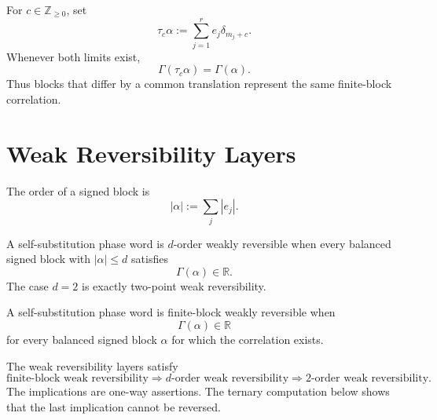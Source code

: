 \begin{definition}
\label{def:innovation-input-block-translation}
For $c\in\mathbb Z_{\ge0}$, set
$$
\tau_c\alpha:=\sum_{j=1}^r e_j\delta_{m_j+c}.
$$
Whenever both limits exist,
$$
\Gamma(\tau_c\alpha)=\Gamma(\alpha).
$$
Thus blocks that differ by a common translation represent the same
finite-block correlation.
\end{definition}

\section{Weak Reversibility Layers}
\label{sec:innovation-input-finite-block-weak-reversibility}

\begin{definition}
\label{def:innovation-input-signed-block-order}
The order of a signed block is
$$
|\alpha|:=\sum_j |e_j|.
$$
\end{definition}

\begin{definition}
\label{def:innovation-input-order-bounded-weak-reversibility}
A self-substitution phase word is $d$-order weakly reversible when every
balanced signed block with $|\alpha|\le d$ satisfies
$$
\Gamma(\alpha)\in\mathbb R.
$$
The case $d=2$ is exactly two-point weak reversibility.
\end{definition}

\begin{definition}
\label{def:innovation-input-finite-block-weak-reversibility}
A self-substitution phase word is finite-block weakly reversible when
$$
\Gamma(\alpha)\in\mathbb R
$$
for every balanced signed block $\alpha$ for which the correlation exists.
\end{definition}


\begin{principle}
\label{prin:innovation-input-reversibility-hierarchy}
The weak reversibility layers satisfy
$$
\text{finite-block weak reversibility}
\Longrightarrow
d\text{-order weak reversibility}
\Longrightarrow
2\text{-order weak reversibility}.
$$
The implications are one-way assertions. The ternary computation below
shows that the last implication cannot be reversed.
\end{principle}

